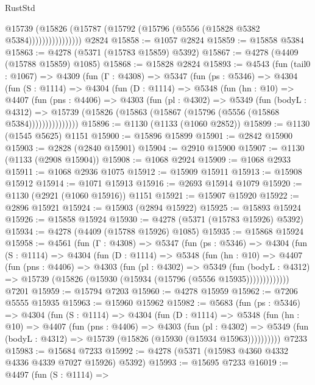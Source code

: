 \begin{lexlean}{RustStd}
\begin{coremodule}
{\begin{coremodule}
{{{{{{{{{{{{{{{{{{{{{{{{{{{{{{{{{{{                      @15739
                        (@15826 (@15787 (@15792 (@15796 (@5556 (@15828 @5382 @5384))))))))))))))))
    @2824
@15858 := @1057 @2824
@15859 := @15858 @5384
@15863 := @4278 (@5371 (@15783 @15859) @5392)
@15867 := @4278 (@4409 (@15788 @15859) @1085)
@15868 := @15828 @2824
@15893 := @4543
    (fun (tail0 : @1067) =>
    @4309
      (fun (Γ : @4308) =>
      @5347
        (fun (ps : @5346) =>
        @4304
          (fun (S : @1114) =>
          @4304
            (fun (D : @1114) =>
            @5348
              (fun (hn : @10) =>
              @4407
                (fun (pns : @4406) =>
                @4303
                  (fun (pl : @4302) =>
                  @5349
                    (fun (bodyL : @4312) =>
                    @15739 (@15826 (@15863 (@15867 (@15796 (@5556 (@15868 @5384)))))))))))))))
@15896 := @1130 (@1133 (@1060 @2852))
@15899 := @1130 (@1545 @5625) @1151
@15900 := @15896 @15899
@15901 := @2842 @15900
@15903 := @2828 (@2840 @15901)
@15904 := @2910 @15900
@15907 := @1130 (@1133 (@2908 @15904))
@15908 := @1068 @2924
@15909 := @1068 @2933
@15911 := @1068 @2936 @1075
@15912 := @15909 @15911
@15913 := @15908 @15912
@15914 := @1071 @15913
@15916 := @2693 @15914 @1079
@15920 := @1130 (@2921 (@1060 @15916)) @1151
@15921 := @15907 @15920
@15922 := @2896 @15921
@15924 := @15903 (@2894 @15922)
@15925 := @15893 @15924
@15926 := @15858 @15924
@15930 := @4278 (@5371 (@15783 @15926) @5392)
@15934 := @4278 (@4409 (@15788 @15926) @1085)
@15935 := @15868 @15924
@15958 := @4561
    (fun (Γ : @4308) =>
    @5347
      (fun (ps : @5346) =>
      @4304
        (fun (S : @1114) =>
        @4304
          (fun (D : @1114) =>
          @5348
            (fun (hn : @10) =>
            @4407
              (fun (pns : @4406) =>
              @4303
                (fun (pl : @4302) =>
                @5349
                  (fun (bodyL : @4312) =>
                  @15739 (@15826 (@15930 (@15934 (@15796 (@5556 @15935)))))))))))))
    @7201
@15959 := @15794 @7203
@15960 := @4278 @15959
@15962 := @7206 @5555 @15935
@15963 := @15960 @15962
@15982 := @5683
    (fun (ps : @5346) =>
    @4304
      (fun (S : @1114) =>
      @4304
        (fun (D : @1114) =>
        @5348
          (fun (hn : @10) =>
          @4407
            (fun (pns : @4406) =>
            @4303
              (fun (pl : @4302) =>
              @5349 (fun (bodyL : @4312) => @15739 (@15826 (@15930 (@15934 @15963))))))))))
    @7233
@15983 := @15684 @7233
@15992 := @4278 (@5371 (@15983 @4360 @4332 @4336 @4339 @7027 @15926) @5392)
@15993 := @15695 @7233
@16019 := @4497
    (fun (S : @1114) =>
}}}}}}}}}}}}}}}}}}}}}}}}}}}}}}}}}}}
\end{coremodule}}
\end{coremodule}
\end{lexlean}
